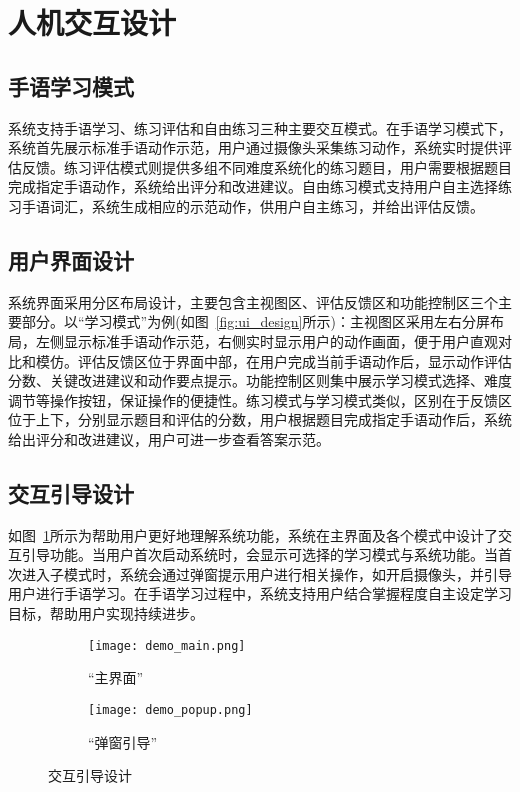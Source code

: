 \section{人机交互设计}

\subsection{手语学习模式}
系统支持手语学习、练习评估和自由练习三种主要交互模式。在手语学习模式下，系统首先展示标准手语动作示范，用户通过摄像头采集练习动作，系统实时提供评估反馈。练习评估模式则提供多组不同难度系统化的练习题目，用户需要根据题目完成指定手语动作，系统给出评分和改进建议。自由练习模式支持用户自主选择练习手语词汇，系统生成相应的示范动作，供用户自主练习，并给出评估反馈。

\subsection{用户界面设计}
系统界面采用分区布局设计，主要包含主视图区、评估反馈区和功能控制区三个主要部分。以“学习模式”为例(如图~\ref{fig:ui_design}所示)：主视图区采用左右分屏布局，左侧显示标准手语动作示范，右侧实时显示用户的动作画面，便于用户直观对比和模仿。评估反馈区位于界面中部，在用户完成当前手语动作后，显示动作评估分数、关键改进建议和动作要点提示。功能控制区则集中展示学习模式选择、难度调节等操作按钮，保证操作的便捷性。练习模式与学习模式类似，区别在于反馈区位于上下，分别显示题目和评估的分数，用户根据题目完成指定手语动作后，系统给出评分和改进建议，用户可进一步查看答案示范。



\subsection{交互引导设计}
如图~\ref{fig:ui_interaction}所示为帮助用户更好地理解系统功能，系统在主界面及各个模式中设计了交互引导功能。当用户首次启动系统时，会显示可选择的学习模式与系统功能。当首次进入子模式时，系统会通过弹窗提示用户进行相关操作，如开启摄像头，并引导用户进行手语学习。在手语学习过程中，系统支持用户结合掌握程度自主设定学习目标，帮助用户实现持续进步。

\begin{figure}
    \centering
    \begin{subfigure}[b]{0.48\linewidth}
        \centering
        \texttt{[image: demo\_main.png]}
        \caption{“主界面”}
    \end{subfigure}
    \hfill
    \begin{subfigure}[b]{0.48\linewidth}
        \centering
        \texttt{[image: demo\_popup.png]}
        \caption{“弹窗引导”}
    \end{subfigure}
    \caption{交互引导设计}
    \label{fig:ui_interaction}
  \end{figure}

